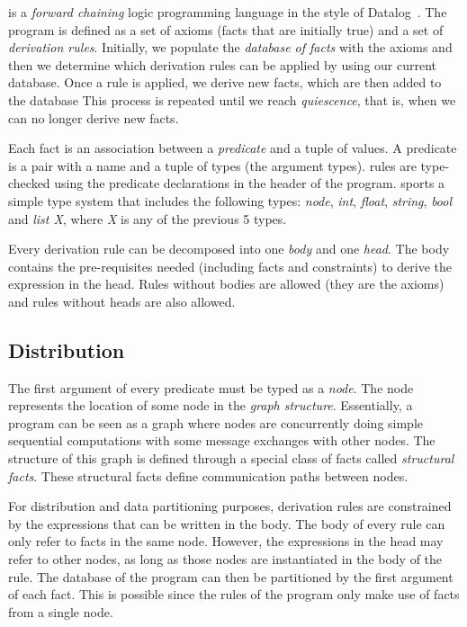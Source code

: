 \lang is a \emph{forward chaining} logic programming language in the style of Datalog~\cite{Ullman:1990:PDK:533142}. The program is defined as a set of axioms (facts that are initially true) and a set of \emph{derivation rules}. Initially, we populate the \emph{database of facts} with the axioms and then we determine which derivation rules can be applied by using our current database. Once a rule is applied, we derive new facts, which are then added to the database
This process is repeated until we reach \emph{quiescence}, that is, when we can no longer derive new facts.

Each fact is an association between a \emph{predicate} and a tuple of values. A predicate is a pair with a name and a tuple of types (the argument types). \lang rules are type-checked using the predicate declarations in the header of the program. \lang sports a simple type system that includes the following types: \emph{node}, \emph{int}, \emph{float}, \emph{string}, \emph{bool} and \emph{list X}, where \emph{X} is any of the previous 5 types.

Every derivation rule can be decomposed into one \emph{body} and one \emph{head}. The body contains the pre-requisites needed (including facts and constraints) to derive the expression in the head. Rules without bodies are allowed (they are the axioms) and rules without heads are also allowed.

\subsection{Distribution}

The first argument of every predicate must be typed as a \emph{node}. The node represents the location of some node in the \emph{graph structure}. Essentially, a program can be seen as a graph where nodes are concurrently doing simple sequential computations with some message exchanges with other nodes. The structure of this graph is defined through a special class of facts called \emph{structural facts}. These structural facts define communication paths between nodes.

For distribution and data partitioning purposes, derivation rules are constrained by the expressions that can be written in the body. The body of every rule can only refer to facts in the same node.
However, the expressions in the head may refer to other nodes, as long as those nodes are instantiated in the body of the rule. The database of the program can then be partitioned by the first argument of each fact. This is possible since the rules of the program only make use of facts from a single node.

